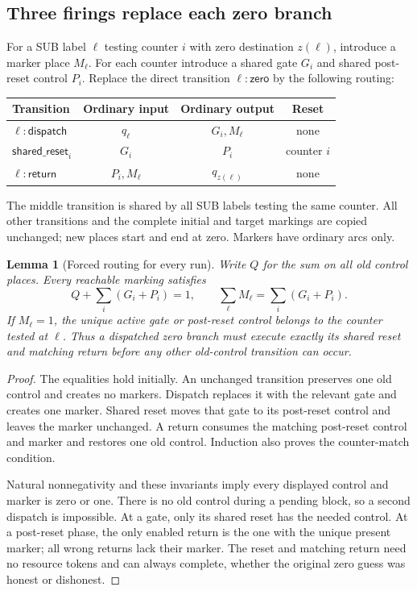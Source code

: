 \documentclass[11pt,letterpaper]{article}
\newtheorem{lemma}[theorem]{Lemma}
\theoremstyle{definition}
\theoremstyle{remark}
\begin{document}
\subsection{Three firings replace each zero branch}
For a SUB label $\ell$ testing counter $i$ with zero destination $z(\ell)$, introduce a marker place $M_\ell$. For each counter introduce a shared gate $G_i$ and shared post-reset control $P_i$. Replace the direct transition $\ell\!:\!\mathsf{zero}$ by the following routing:
\begin{center}
\begin{tabular}{lccc}
\toprule
Transition & Ordinary input & Ordinary output & Reset\\\midrule
$\ell\!:\!\mathsf{dispatch}$ & $q_\ell$ & $G_i,M_\ell$ & none\\
$\mathsf{shared\_reset}_i$ & $G_i$ & $P_i$ & counter $i$\\
$\ell\!:\!\mathsf{return}$ & $P_i,M_\ell$ & $q_{z(\ell)}$ & none\\\bottomrule
\end{tabular}
\end{center}
The middle transition is shared by all SUB labels testing the same counter. All other transitions and the complete initial and target markings are copied unchanged; new places start and end at zero. Markers have ordinary arcs only.

\begin{lemma}[Forced routing for every run]
Write $Q$ for the sum on all old control places. Every reachable marking satisfies
\[
 Q+\sum_i(G_i+P_i)=1,\qquad
 \sum_\ell M_\ell=\sum_i(G_i+P_i).
\]
If $M_\ell=1$, the unique active gate or post-reset control belongs to the counter tested at $\ell$. Thus a dispatched zero branch must execute exactly its shared reset and matching return before any other old-control transition can occur.
\end{lemma}
\begin{proof}
The equalities hold initially. An unchanged transition preserves one old control and creates no markers. Dispatch replaces it with the relevant gate and creates one marker. Shared reset moves that gate to its post-reset control and leaves the marker unchanged. A return consumes the matching post-reset control and marker and restores one old control. Induction also proves the counter-match condition.

Natural nonnegativity and these invariants imply every displayed control and marker is zero or one. There is no old control during a pending block, so a second dispatch is impossible. At a gate, only its shared reset has the needed control. At a post-reset phase, the only enabled return is the one with the unique present marker; all wrong returns lack their marker. The reset and matching return need no resource tokens and can always complete, whether the original zero guess was honest or dishonest.
\end{proof}
\end{document}
